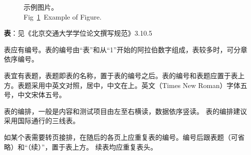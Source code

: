 \begin{figure}[h]
 \addtocounter{subfigure}{-1}
 \caption{示例图片。\\Fig~\ref{fig:02:02}~Example of Figure.}
 \label{fig:02:02}
  \end{figure} 

\textbf{表}：见《北京交通大学学位论文撰写规范》3.10.5

表应有编号。表的编号由“表”和从“1”开始的阿拉伯数字组成，表较多时，可分章依序编号。

表宜有表题，表题即表的名称，置于表的编号之后。表的编号和表题应置于表上方。表题采用中英文对照，居中，中文在上。英文（Times New Roman）字体五号，中文宋体五号。

表的编排，一般是内容和测试项目由左至右横读，数据依序竖读。
表的编排建议采用国际通行的三线表。

如某个表需要转页接排，在随后的各页上应重复表的编号。编号后跟表题（可省略）和“（续）”，置于表上方。
续表均应重复表头。

